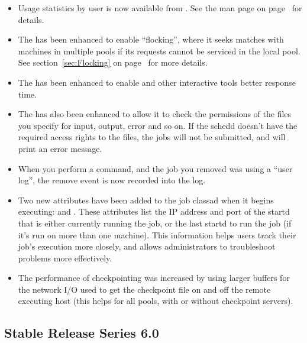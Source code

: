 \begin{itemize}
\item Usage statistics by user is now available from
.
See the man page on page~\pageref{man-condor-userprio} for details. 

\item The  has been enhanced to enable ``flocking'',
where it seeks matches with machines in multiple pools if its requests
cannot be serviced in the local pool.
See section~\ref{sec:Flocking} on page~\pageref{sec:Flocking} for more
details.

\item The  has been enhanced to enable  and
other interactive tools better response time.

\item The  has also been enhanced to allow it to check
the permissions of the files you specify for input, output, error and
so on.  
If the schedd doesn't have the required access rights to the files,
the jobs will not be submitted, and  will print an
error message.

\item When you perform a  command, and the job you removed
was using a ``user log'', the remove event is now recorded into the
log. 

\item Two new attributes have been added to the job classad when it 
begins executing:  and .
These attributes list the IP address and port of the startd that is
either currently running the job, or the last startd to run the job
(if it's run on more than one machine). 
This information helps users track their job's execution more closely,
and allows administrators to troubleshoot problems more effectively. 

\item The performance of checkpointing was increased by using larger
buffers for the network I/O used to get the checkpoint file on and off
the remote executing host (this helps for all pools, with or without
checkpoint servers). 

\end{itemize}

\subsection{\label{sec:History-6-0}Stable Release Series 6.0}

